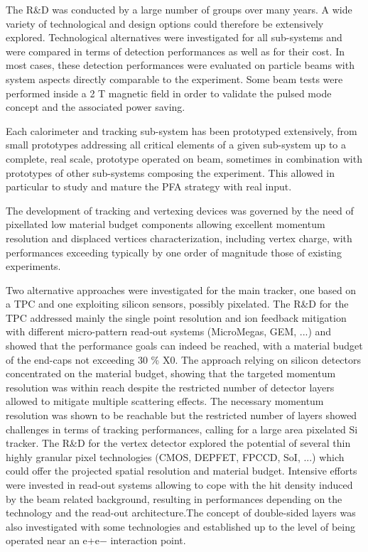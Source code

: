\documentclass[%
 reprint,
 amsmath,amssymb,
 aps,
]{revtex4-1}
\begin{document}
The R\&D was conducted by a large number of groups over many years. A wide variety of technological and design options could therefore be extensively explored. Technological alternatives were investigated for all sub-systems and were compared in terms of detection performances as well as for their cost. In most cases, these detection performances were evaluated on particle beams with system aspects directly comparable to the experiment. Some beam tests were performed inside a 2 T magnetic ﬁeld in order to validate the pulsed mode concept and the associated power saving.

Each calorimeter and tracking sub-system has been prototyped extensively, from small prototypes addressing all critical elements of a given sub-system up to a complete, real scale, prototype operated on beam, sometimes in combination with prototypes of other sub-systems composing the experiment. This allowed in particular to study and mature the PFA strategy with real input.

The development of tracking and vertexing devices was governed by the need of pixellated low material budget components allowing excellent momentum resolution and displaced vertices characterization, including vertex charge, with performances exceeding typically by one order of magnitude those of existing experiments.

Two alternative approaches were investigated for the main tracker, one based on a TPC and one exploiting silicon sensors, possibly pixelated. The R&D for the TPC addressed mainly the single point resolution and ion feedback mitigation with diﬀerent micro-pattern read-out systems (MicroMegas, GEM, ...) and showed that the performance goals can indeed be reached, with a material budget of the end-caps not exceeding 30 \% X0. The approach relying on silicon detectors concentrated on the material budget, showing that the targeted momentum resolution was within reach despite the restricted number of detector layers allowed to mitigate multiple scattering eﬀects. The necessary momentum resolution was shown to be reachable but the restricted number of layers showed challenges in terms of tracking performances, calling for a large area pixelated Si tracker.
The R\&D for the vertex detector explored the potential of several thin highly granular pixel technologies (CMOS, DEPFET, FPCCD, SoI, ...) which could oﬀer the projected spatial resolution and material budget. Intensive eﬀorts were invested in read-out systems allowing to cope with the hit density induced by the beam related background, resulting in performances depending on the technology and the read-out architecture.The concept of double-sided layers was also investigated with some technologies and established up to the level of being operated near an e+e− interaction point.
\end{document}
